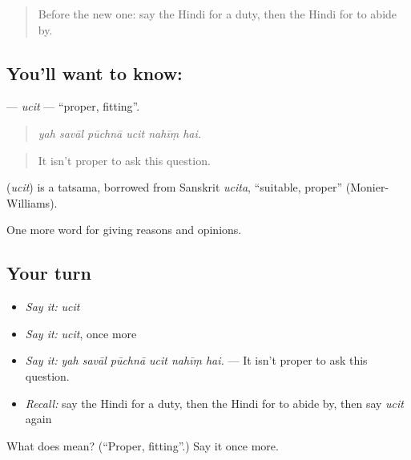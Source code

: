 \label{lesson:HI-C351-ucit}



\begin{quote}
Before the new one: say the Hindi for a duty, then the Hindi for to abide by.
\end{quote}

\subsection*{You'll want to know: }
\textbf{} — \emph{ucit} — \textquotedblleft{}proper, fitting\textquotedblright{}.

\begin{quote}
     
\end{quote}

\begin{quote}
\emph{yah savāl pūchnā ucit nahīṃ hai.}
\end{quote}

\begin{quote}
It isn't proper to ask this question.
\end{quote}

\begin{cousinweb}
\textbf{} (\emph{ucit}) is a tatsama, borrowed from Sanskrit \emph{ucita}, \textquotedblleft{}suitable, proper\textquotedblright{} (Monier-Williams).
\end{cousinweb}

\begin{grammarlens}[title={What you've built}]
One more word for giving reasons and opinions.
\end{grammarlens}

\subsection*{Your turn}
\begin{itemize}
\raggedright
  \item \emph{Say it:} \emph{ucit}
  \item \emph{Say it:} \emph{ucit}, once more
  \item \emph{Say it:} \emph{yah savāl pūchnā ucit nahīṃ hai.} — It isn't proper to ask this question.
  \item \emph{Recall:} say the Hindi for a duty, then the Hindi for to abide by, then say \emph{ucit} again
\end{itemize}

\begin{tcolorbox}[breakable,colback=teal!4,colframe=teal!35!black,title={Before you move on}]
What does  mean? (\textquotedblleft{}Proper, fitting\textquotedblright{}.) Say it once more.
\end{tcolorbox}
